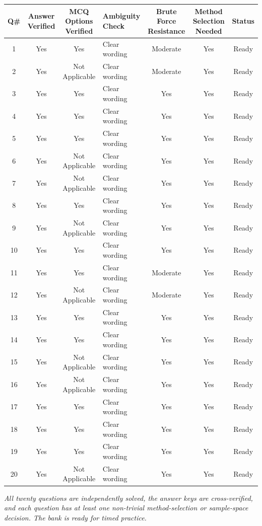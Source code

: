 \documentclass[11pt,a4paper]{article}
\begin{document}
\begin{center}
\renewcommand{\arraystretch}{1.18}
\footnotesize
\begin{longtable}{|c|c|c|l|c|c|c|}
\hline
\textbf{Q\#} & \textbf{Answer Verified} & \textbf{MCQ Options Verified} & \textbf{Ambiguity Check} & \textbf{Brute Force Resistance} & \textbf{Method Selection Needed} & \textbf{Status} \\
\hline
1  & Yes & Yes & Clear wording & Moderate & Yes & Ready \\
2  & Yes & Not Applicable & Clear wording & Moderate & Yes & Ready \\
3  & Yes & Yes & Clear wording & Yes & Yes & Ready \\
4  & Yes & Yes & Clear wording & Yes & Yes & Ready \\
5  & Yes & Yes & Clear wording & Yes & Yes & Ready \\
6  & Yes & Not Applicable & Clear wording & Yes & Yes & Ready \\
7  & Yes & Not Applicable & Clear wording & Yes & Yes & Ready \\
8  & Yes & Yes & Clear wording & Yes & Yes & Ready \\
9  & Yes & Not Applicable & Clear wording & Yes & Yes & Ready \\
10 & Yes & Yes & Clear wording & Yes & Yes & Ready \\
11 & Yes & Yes & Clear wording & Moderate & Yes & Ready \\
12 & Yes & Not Applicable & Clear wording & Moderate & Yes & Ready \\
13 & Yes & Yes & Clear wording & Yes & Yes & Ready \\
14 & Yes & Yes & Clear wording & Yes & Yes & Ready \\
15 & Yes & Not Applicable & Clear wording & Yes & Yes & Ready \\
16 & Yes & Not Applicable & Clear wording & Yes & Yes & Ready \\
17 & Yes & Yes & Clear wording & Yes & Yes & Ready \\
18 & Yes & Yes & Clear wording & Yes & Yes & Ready \\
19 & Yes & Yes & Clear wording & Yes & Yes & Ready \\
20 & Yes & Not Applicable & Clear wording & Yes & Yes & Ready \\
\hline
\end{longtable}
\end{center}

\vspace{6pt}

\textit{All twenty questions are independently solved, the answer keys are cross-verified, and each question has at least one non-trivial method-selection or sample-space decision. The bank is ready for timed practice.}
\end{document}
